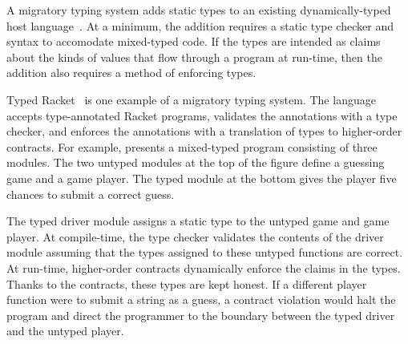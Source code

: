 A migratory typing system adds static types to an existing
dynamically-typed host language~\cite{tfffgksst-snapl-2017}.
At a minimum, the addition requires a static type checker and
syntax to accomodate mixed-typed code.
If the types are intended as claims about the kinds of values that
flow through a program at run-time, then the addition also requires a method
of enforcing types.

Typed Racket~\cite{tf-popl-2008} is one example of a migratory typing system.
The language accepts type-annotated Racket programs,
validates the annotations with a type checker, and enforces the annotations
with a translation of types to higher-order contracts.
For example,  presents a mixed-typed
program consisting of three modules.
The two untyped modules at the top of the figure define a guessing game
and a game player.
The typed module at the bottom gives the player five chances to submit a
correct guess.

The typed driver module assigns a static type to the untyped game and
 game player.
At compile-time, the type checker validates the contents of the driver module
 assuming that the types assigned to these untyped functions are correct.
At run-time, higher-order contracts dynamically enforce the claims in the types.
Thanks to the contracts, these types are kept honest.
If a different player function were to submit a string as a guess, a contract
 violation would halt the program and direct the programmer to the boundary
 between the typed driver and the untyped player.

